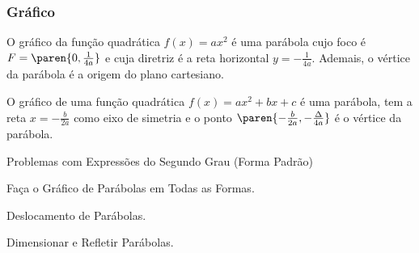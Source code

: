 \subsubsection{Gráfico}

\begin{example}
O gráfico da função quadrática $f(x) = ax^2$ é uma parábola cujo
foco é $F = \paren{0, \frac 1 {4a}}$ e cuja diretriz é a reta
horizontal $y = -\frac{1}{4a}$. Ademais, o vértice da parábola é a
origem do plano cartesiano.
\end{example}

\begin{proposition}
O gráfico de uma função quadrática $f(x) = ax^2 + bx + c$ é uma
parábola, tem a reta $x = -\frac {b}{2a}$ como eixo de simetria e o
ponto $\paren{-\frac {b} {2a}, -\frac {\Delta} {4a}}$ é o vértice da
parábola.
\end{proposition}

\begin{onlineact}
{Problemas com Expressões do Segundo Grau (Forma Padrão)}
\end{onlineact}

\begin{onlineact}
{Faça o Gráfico de Parábolas em Todas as Formas}.
\end{onlineact}

\begin{onlineact}
{Deslocamento de Parábolas}.
\end{onlineact}

\begin{onlineact}
{Dimensionar e Refletir Parábolas}.
\end{onlineact}